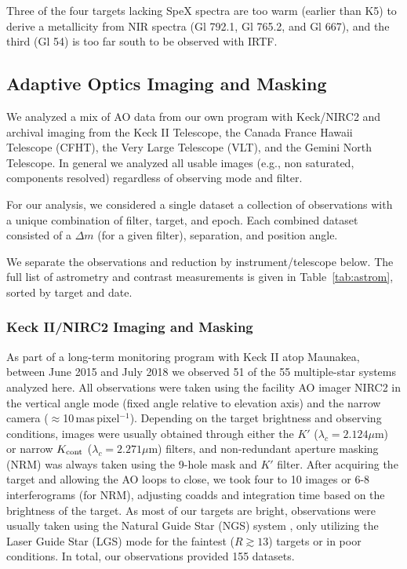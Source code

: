 \documentclass[twocolumn]{aastex62}
\newcommand{\um}{$\mu$m}
\begin{document}
Three of the four targets lacking SpeX spectra are too warm (earlier than K5) to derive a metallicity from NIR spectra (Gl 792.1, Gl 765.2, and Gl 667), and the third (Gl 54) is too far south to be observed with IRTF. 

\subsection{Adaptive Optics Imaging and Masking}\label{sec:ao}

We analyzed a mix of AO data from our own program with Keck/NIRC2 and archival imaging from the Keck II Telescope, the Canada France Hawaii Telescope (CFHT), the Very Large Telescope (VLT), and the Gemini North Telescope. In general we analyzed all usable images (e.g., non saturated, components resolved) regardless of observing mode and filter. 

For our analysis, we considered a single dataset a collection of observations with a unique combination of filter, target, and epoch. Each combined dataset consisted of a $\Delta m$ (for a given filter), separation, and position angle. 

We separate the observations and reduction by instrument/telescope below. The full list of astrometry and contrast measurements is given in Table~\ref{tab:astrom}, sorted by target and date. 

\subsubsection{Keck II/NIRC2 Imaging and Masking}%
As part of a long-term monitoring program with Keck II atop Maunakea, between June 2015 and July 2018 we observed 51 of the 55 multiple-star systems analyzed here. All observations were taken using the facility AO imager NIRC2 in the vertical angle mode (fixed angle relative to elevation axis) and the narrow camera ($\approx$10\,mas\,pixel$^{-1}$). Depending on the target brightness and observing conditions, images were usually obtained through either the $K'$ ($\lambda_c=2.124$\um) or narrow $K_{\rm{cont}}$ ($\lambda_c=2.271$\um) filters, and non-redundant aperture masking (NRM) was always taken using the 9-hole mask and $K'$ filter. After acquiring the target and allowing the AO loops to close, we took four to 10 images or 6-8 interferograms (for NRM), adjusting coadds and integration time based on the brightness of the target. As most of our targets are bright, observations were usually taken using the Natural Guide Star (NGS) system \citep{2000PASP..112..315W,2004ApOpt..43.5458V}, only utilizing the Laser Guide Star (LGS) mode for the faintest ($R\gtrsim13$) targets or in poor conditions. In total, our observations provided 155 datasets.%
\end{document}
